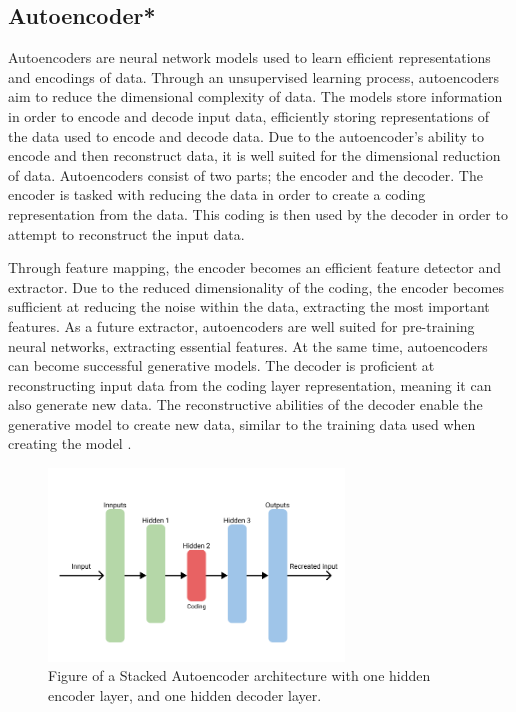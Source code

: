 
\subsection{Autoencoder*}
\label{section:B&T:Autoencoder}
Autoencoders are neural network models used to learn efficient representations and encodings of data.
Through an unsupervised learning process, autoencoders aim to reduce the dimensional complexity of data.
The models store information in order to encode and decode input data,
efficiently storing representations of the data used to encode and decode data.
Due to the autoencoder's ability to encode and then reconstruct data, it is well suited for the dimensional reduction of data.
Autoencoders consist of two parts; the encoder and the decoder.
The encoder is tasked with reducing the data in order to create a coding representation from the data.
This coding is then used by the decoder in order to attempt to reconstruct the input data.

Through feature mapping, the encoder becomes an efficient feature detector and extractor.
Due to the reduced dimensionality of the coding, the encoder becomes sufficient at reducing the noise within the data, extracting the most important features.
As a future extractor, autoencoders are well suited for pre-training neural networks, extracting essential features.
At the same time, autoencoders can become successful generative models.
The decoder is proficient at reconstructing input data from the coding layer representation, meaning it can also generate new data.
The reconstructive abilities of the decoder enable the generative model to create new data, similar to the training data used when creating the model
\cite[p.~506-508]{Geron2017}.


\begin{figure}[h!]
    \centering
    \includegraphics[width=0.7\textwidth]{./sections/BT/figures/Autoencoder.png}
    \hfill
    \caption{Figure of a Stacked Autoencoder architecture with one hidden encoder layer, and one hidden decoder layer.}
    \label{fig:stacked_autoencoder_arch}
\end{figure}




